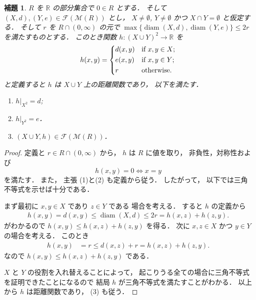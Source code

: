 \documentclass[leqno, 12pt]{jsarticle}
\newtheorem{lem}[thm]{補題}
\newcommand{\rr}{\mathbb{R}}
\DeclareMathOperator{\di}{diam}
\newcommand{\Met}[1]{\mathscr{M}(#1)}
\newcommand{\FinitePart}[1]{\mathscr{F}(#1)}
\newcommand{\FinMet}[1]{\FinitePart{\Met{#1}}}
\newcommand{\restr}[2]{#1|_{#2}}
\begin{document}
\begin{lem}\label{lem:amal:pushout2}
$R$
を
$\rr$
の部分集合で
$0\in R$
とする．
そして
$(X, d), (Y, e)\in \FinMet{R}$
とし，
$X\neq\emptyset$,
$Y\neq\emptyset$
かつ
$X\cap Y=\emptyset$%
と仮定する．
そして
$r$
を
$R\cap(0,\infty)$
の元で
$\max\{\di(X, d), \di(Y, e)\}\le 2r$
を満たすものとする．
このとき関数
$h\colon (X\cup Y)^2\to \rr$
を
\begin{align*}
	h(x, y)=
		\begin{dcases}
		d(x, y) & \text{if
$x, y\in X$;}\\
		e(x, y) & \text{if
$x, y\in Y$;}\\
		r & \text{otherwise.}
				\end{dcases}
\end{align*}
と定義すると
$h$
は
$X\cup Y$
上の距離関数であり，%
以下を満たす．
\begin{enumerate}[label=\textup{(\arabic*)}]
\item
$\restr{h}{X^2}=d$;
	\item
$\restr{h}{Y^2}=e$．
	\item
$(X\cup Y, h)\in \FinMet{R}$．
\end{enumerate}
\end{lem}
\begin{proof}
定義と
$r\in R\cap(0,\infty)$
から，
$h$
は
$R$
に値を取り，
非負性，対称性および
\[
h(x,y)=0\iff x=y
\]
を満たす．
また，
主張
\textup{(1)}と\textup{(2)}
も定義から従う．
したがって，
以下では三角不等式を示せば十分である．



まず最初に
$x, y\in X$
であり
$z\in Y$
である
場合を考える．
すると%
$h$%
の定義から
\begin{align*}
	h(x, y)=d(x, y)\le \di(X, d)\le 2r=h(x, z)+h(z, y).
\end{align*}
がわかるので
$h(x, y)\le h(x, z)+h(z, y)$%
を得る．
次に
$x, z\in  X$
かつ
$y\in Y$
の場合を考える．
このとき
\begin{align*}
	h(x, y)&=r \le d(x, z)+r =h(x, z)+h(z, y).
\end{align*}
なので
$h(x, y)\le h(x, z)+h(z, y)$%
である．

$X$
と
$Y$
の役割を入れ替えることによって，
起こりうる全ての場合に三角不等式を証明できたことになるので
結局
$h$
が三角不等式を満たすことがわかる．
以上から
$h$
は距離関数であり，
\textup{(3)}
も従う．
\end{proof}
\end{document}
